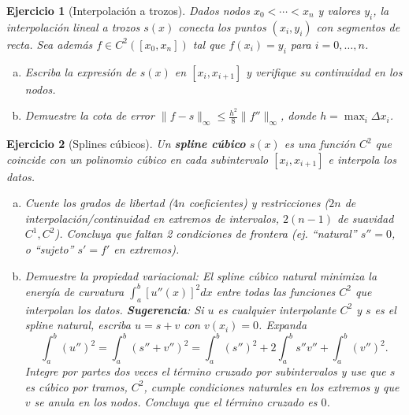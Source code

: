 \documentclass[12pt]{article}
\newtheorem{exercise}{Ejercicio}
\begin{document}
\begin{exercise}[Interpolación a trozos]
Dados nodos $x_0 < \cdots < x_n$ y valores $y_i$, la interpolación lineal a trozos $s(x)$ conecta los puntos $(x_i, y_i)$ con segmentos de recta.
Sea además $f \in C^2([x_0,x_n])$ tal que $f(x_i)=y_i$ para $i=0,\ldots,n$.
\begin{enumerate}[(a)]
\item Escriba la expresión de $s(x)$ en $[x_i, x_{i+1}]$ y verifique su continuidad en los nodos.
\item Demuestre la cota de error $\|f - s\|_\infty \leq \frac{h^2}{8} \|f''\|_\infty$, donde $h = \max_i \Delta x_i$.
\end{enumerate}
\end{exercise}

\begin{exercise}[Splines cúbicos]
Un \textbf{spline cúbico} $s(x)$ es una función $C^2$ que coincide con un polinomio cúbico en cada subintervalo $[x_i, x_{i+1}]$ e interpola los datos.
\begin{enumerate}[(a)]
\item Cuente los grados de libertad ($4n$ coeficientes) y restricciones ($2n$ de interpolación/continuidad en extremos de intervalos, $2(n-1)$ de suavidad $C^1, C^2$). Concluya que faltan 2 condiciones de frontera (ej. ``natural'' $s''=0$, o ``sujeto'' $s'=f'$ en extremos).
\item Demuestre la propiedad variacional: El spline cúbico natural minimiza la energía de curvatura $\int_a^b [u''(x)]^2 dx$ entre todas las funciones $C^2$ que interpolan los datos.
\textbf{Sugerencia}: Si $u$ es cualquier interpolante $C^2$ y $s$ es el spline natural, escriba $u=s+v$ con $v(x_i)=0$. Expanda
\[
\int_a^b (u'')^2 = \int_a^b (s''+v'')^2 = \int_a^b (s'')^2 + 2\int_a^b s''v'' + \int_a^b (v'')^2.
\]
Integre por partes dos veces el término cruzado por subintervalos y use que $s$ es cúbico por tramos, $C^2$, cumple condiciones naturales en los extremos y que $v$ se anula en los nodos. Concluya que el término cruzado es $0$.
\end{enumerate}
\end{exercise}
\end{document}
